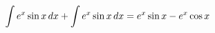 \documentclass[preview]{standalone}
\begin{document}
\begin{align*}
\special{dvisvgm:raw <g id='unique000'>}\int e^x \sin x \, dx + \int e^x \sin x \, dx = e^x \sin x - e^x \cos x\special{dvisvgm:raw </g>}
\end{align*}
\end{document}
